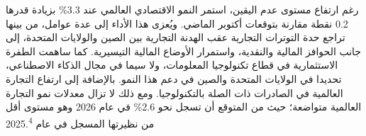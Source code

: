 رغم ارتفاع مستوى عدم اليقين، استمر النمو الاقتصادي العالمي عند 3.3\% بزيادة قدرها 0.2 نقطة مقارنة بتوقعات أكتوبر الماضي. ويُعزى هذا الأداء إلى عدة عوامل، من بينها تراجع حدة التوترات التجارية عقب الهدنة التجارية بين الصين والولايات المتحدة، إلى جانب الحوافز المالية والنقدية، واستمرار الأوضاع المالية التيسيرية. كما ساهمت الطفرة الاستثمارية في قطاع تكنولوجيا المعلومات، ولا سيما في مجال الذكاء الاصطناعي، تحديدا في الولايات المتحدة والصين في دعم هذا النمو. بالإضافة إلى ارتفاع التجارة العالمية في الصادرات ذات الصلة بالتكنولوجيا. ومع ذلك لا تزال معدلات نمو التجارة العالمية متواضعة؛ حيث من المتوقع أن تسجل نحو 2.6\% في عام 2026 وهو مستوى أقل من نظيرتها المسجل في عام 2025.\textsuperscript{4}
